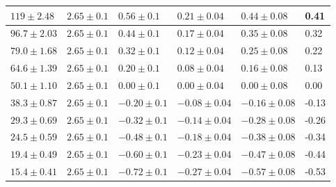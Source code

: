 \begin{enumerate}
\begin{maintable}[ht]
\begin{tabular}{|l|l|l|l|l|l|}
$119\pm2.48$                           & $2.65\pm0.1$                   & $0.56\pm0.1$                   & $0.21\pm0.04$                   & $0.44\pm0.08$                        & 0.41                                   \\ \hline
$96.7\pm2.03$                          & $2.65\pm0.1$                   & $0.44\pm0.1$                   & $0.17\pm0.04$                   & $0.35\pm0.08$                        & 0.32                                   \\ \hline
$79.0\pm1.68$                          & $2.65\pm0.1$                   & $0.32\pm0.1$                   & $0.12\pm0.04$                   & $0.25\pm0.08$                        & 0.22                                   \\ \hline
$64.6\pm1.39$                          & $2.65\pm0.1$                   & $0.20\pm0.1$                   & $0.08\pm0.04$                   & $0.16\pm0.08$                        & 0.13                                   \\ \hline
$50.1\pm1.10$                          & $2.65\pm0.1$                   & $0.00\pm0.1$                   & $0.00\pm0.04$                   & $0.00\pm0.08$                        & 0.00                                   \\ \hline
$38.3\pm0.87$                          & $2.65\pm0.1$                   & $-0.20\pm0.1$                  & $-0.08\pm0.04$                  & $-0.16\pm0.08$                       & -0.13                                  \\ \hline
$29.3\pm0.69$                          & $2.65\pm0.1$                   & $-0.32\pm0.1$                  & $-0.14\pm0.04$                  & $-0.28\pm0.08$                       & -0.26                                  \\ \hline
$24.5\pm0.59$                          & $2.65\pm0.1$                   & $-0.48\pm0.1$                  & $-0.18\pm0.04$                  & $-0.38\pm0.08$                       & -0.34                                  \\ \hline
$19.4\pm0.49$                          & $2.65\pm0.1$                   & $-0.60\pm0.1$                   & $-0.23\pm0.04$                  & $-0.47\pm0.08$                       & -0.44                                  \\ \hline
$15.4\pm0.41$                          & $2.65\pm0.1$                   & $-0.72\pm0.1$                  & $-0.27\pm0.04$                  & $-0.57\pm0.08$                       & -0.53                                  \\ \hline

\end{tabular}
\end{maintable}
\end{enumerate}

